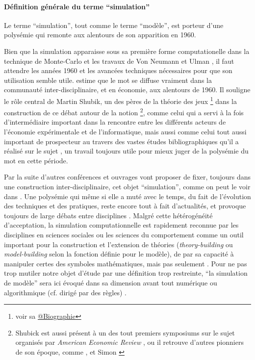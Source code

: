 \paragraph{Définition générale du terme \enquote{simulation}}

Le terme \enquote{simulation}, tout comme le terme \enquote{modèle}, est porteur d'une polysémie qui remonte aux alentours de son apparition en 1960. 

Bien que la simulation apparaisse sous sa première forme computationelle dans la technique de Monte-Carlo et les travaux de Von Neumann et Ulman \autocite{Eckhardt1987}, il faut attendre les années 1960 et les avancées techniques nécessaires pour que son utilisation semble utile. \textcite{Morgan2004} estime que le mot se diffuse vraiment dans la communauté inter-disciplinaire, et en économie, aux alentours de 1960. Il souligne le rôle central de Martin Shubik, un des pères de la théorie des jeux \footnote{voir sa \href{http://blogs.library.duke.edu/rubenstein/2012/12/18/the-martin-shubik-papers-from-early-game-theory-to-the-strategic-analysis-of-war/}{@Biographie}} dans la construction de ce débat autour de la notion \footnote{Shubick est aussi présent à un des tout premiers symposiums sur le sujet organisés par \textit{American Economic Review} \autocite{Shubik1960b}, ou il retrouve d'autres pionniers de son époque, comme \textcite{Orcutt1960}, et Simon \autocite{Clarkson1960}}, comme celui qui a servi à la fois d'intermédiaire important dans la rencontre entre les différents acteurs de l'économie expérimentale et de l'informatique, mais aussi comme celui tout aussi important de prospecteur au travers des vastes études bibliographiques qu'il a réalisé sur le sujet \autocite{Shubik1960a} \autocite{Shubik1972}, un travail toujours utile pour mieux juger de la polysémie du mot en cette période.

Par la suite d'autres conférences et ouvrages vont proposer de fixer, toujours dans une construction inter-disciplinaire, cet objet \enquote{simulation}, comme on peut le voir dans \autocite{Guetzkow1962, Guetzkow1972,Dutton1971}. Une polysémie qui même si elle a muté avec le temps, du fait de l'évolution des techniques et des pratiques, reste encore tout à fait d'actualités, et provoque toujours de large débats entre disciplines \autocite{Varenne2013}. Malgré cette hétérogénéité d'acceptation, la simulation computationnelle est rapidement reconnue par les disciplines en sciences sociales ou les sciences du comportement comme un outil important pour la construction et l'extension de théories (\textit{theory-building} ou \textit{model-building} selon la fonction définie pour le modèle), de par sa capacité à manipuler certes des symboles mathématiques, mais pas seulement \autocite[924-325]{Clarkson1960}. Pour ne pas trop mutiler notre objet d'étude par une définition trop restreinte, \enquote{la simulation de modèle} sera ici évoqué dans sa dimension avant tout numérique ou algorithmique (cf. dirigé par des règles) \autocite[36-38]{Varenne2013}.

